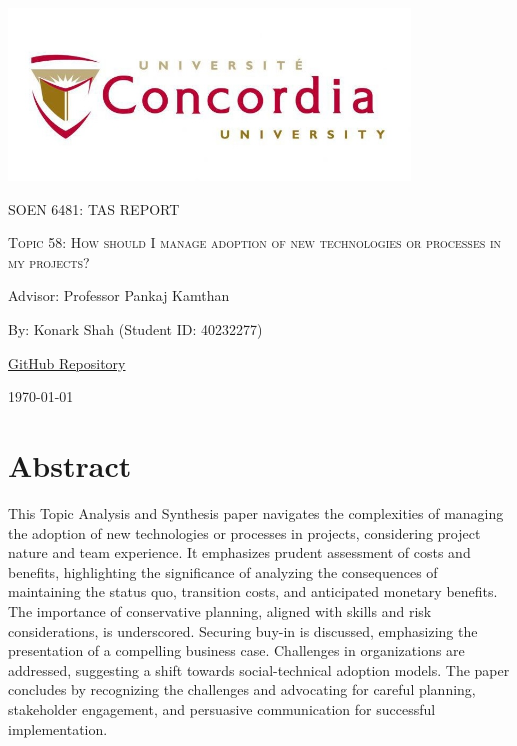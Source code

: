 \documentclass{article}
\begin{document}
\begin{titlepage}
    \centering
    \includegraphics[width=0.8\textwidth]{image.jpeg}\par %
     \vspace{2cm}
    {\scshape\Large SOEN 6481: TAS REPORT \par}
    \vspace{1.5cm}
    {\scshape\Huge Topic 58: How should I manage adoption of new technologies or processes in my projects?\par}
    \vspace{1.5cm}
    {\large Advisor: Professor Pankaj Kamthan\par}
    \vspace{1.5cm}
    {\large By: Konark Shah (Student ID: 40232277)\par}
    \vspace{1cm}
    {\large \href{https://github.com/konark2010/SOEN-6841-TAS}{GitHub Repository}\par}
    \vspace{1cm}
    {\large \today\par}
\end{titlepage}

\tableofcontents

\newpage

\section*{Abstract}
This Topic Analysis and Synthesis paper navigates the complexities of managing the adoption of new technologies or processes in projects, considering project nature and team experience. It emphasizes prudent assessment of costs and benefits, highlighting the significance of analyzing the consequences of maintaining the status quo, transition costs, and anticipated monetary benefits. The importance of conservative planning, aligned with skills and risk considerations, is underscored. Securing buy-in is discussed, emphasizing the presentation of a compelling business case. Challenges in organizations are addressed, suggesting a shift towards social-technical adoption models. The paper concludes by recognizing the challenges and advocating for careful planning, stakeholder engagement, and persuasive communication for successful implementation.
\end{document}
